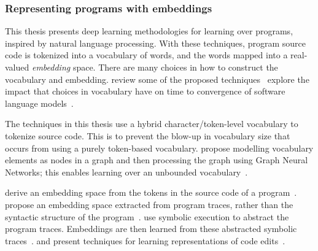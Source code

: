 \subsubsection{Representing programs with embeddings}

This thesis presents deep learning methodologies for learning over programs, inspired by natural language processing. With these techniques, program source code is tokenized into a vocabulary of words, and the words mapped into a real-valued \emph{embedding} space.
There are many choices in how to construct the vocabulary and embedding. \citeauthor{Chen2019} review some of the proposed techniques~\cite{Chen2019}
\citeauthor{Babii} explore the impact that choices in vocabulary have on time to convergence of software language models~\cite{Babii}.

The techniques in this thesis use a hybrid character/token-level vocabulary to tokenize source code. This is to prevent the blow-up in vocabulary size that occurs from using a purely token-based vocabulary. \citeauthor{Cvitkovic2018a} propose modelling vocabulary elements as nodes in a graph and then processing the graph using Graph Neural Networks; this enables learning over an unbounded vocabulary~\cite{Cvitkovic2018a}.

\citeauthor{Mou2016} derive an embedding space from the tokens in the source code of a program~\cite{Mou2016}.
\citeauthor{Wang2017d} propose an embedding space extracted from program traces, rather than the syntactic structure of the program~\cite{Wang2017d}.
\citeauthor{Henkel2018} use symbolic execution to abstract the program traces. Embeddings are then learned from these abstracted symbolic traces~\cite{Henkel2018}.
%
 \citeauthor{Yin2018} and \citeauthor{Tufano2019} present techniques for learning representations of code edits~\cite{Yin2018,Tufano2019}.

